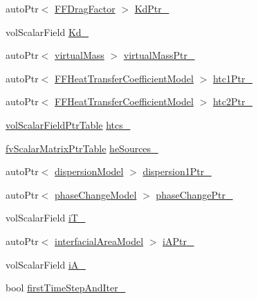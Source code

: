 \begin{DoxyCompactItemize}
\item 
auto\+Ptr$<$ \hyperlink{classFoam_1_1FFDragFactor}{F\+F\+Drag\+Factor} $>$ \hyperlink{classFoam_1_1FFPair_a4de7187addeb2b998f5759f56cb8cf88}{Kd\+Ptr\+\_\+}
\item 
vol\+Scalar\+Field \hyperlink{classFoam_1_1FFPair_a51e41ffd2b3baf262309a2669155e99c}{Kd\+\_\+}
\item 
auto\+Ptr$<$ \hyperlink{classFoam_1_1virtualMass}{virtual\+Mass} $>$ \hyperlink{classFoam_1_1FFPair_a1227c8d238e0135cb8a5c76e95ce1bfb}{virtual\+Mass\+Ptr\+\_\+}
\item 
auto\+Ptr$<$ \hyperlink{classFoam_1_1FFHeatTransferCoefficientModel}{F\+F\+Heat\+Transfer\+Coefficient\+Model} $>$ \hyperlink{classFoam_1_1FFPair_a979ece87b5bb1a7c5eac17835ba09d8a}{htc1\+Ptr\+\_\+}
\item 
auto\+Ptr$<$ \hyperlink{classFoam_1_1FFHeatTransferCoefficientModel}{F\+F\+Heat\+Transfer\+Coefficient\+Model} $>$ \hyperlink{classFoam_1_1FFPair_a3229083e4ddb7541c50f509732defb95}{htc2\+Ptr\+\_\+}
\item 
\hyperlink{classFoam_1_1FFPair_a0848121d1a9fe5a3d3471760ef9de2fe}{vol\+Scalar\+Field\+Ptr\+Table} \hyperlink{classFoam_1_1FFPair_a1fbdcaf01d7a27bcb2ee93d15c3f8992}{htcs\+\_\+}
\item 
\hyperlink{classFoam_1_1FFPair_a47dacb23df9a151e6da0902f1726ef21}{fv\+Scalar\+Matrix\+Ptr\+Table} \hyperlink{classFoam_1_1FFPair_a1fb6dd21f501635afc552fde5a0fc7b3}{he\+Sources\+\_\+}
\item 
auto\+Ptr$<$ \hyperlink{classFoam_1_1dispersionModel}{dispersion\+Model} $>$ \hyperlink{classFoam_1_1FFPair_abed55520bd9864a4313dcef87b9d53b7}{dispersion1\+Ptr\+\_\+}
\item 
auto\+Ptr$<$ \hyperlink{classFoam_1_1phaseChangeModel}{phase\+Change\+Model} $>$ \hyperlink{classFoam_1_1FFPair_a235b7644ad484d362d5da4f6f7f34c38}{phase\+Change\+Ptr\+\_\+}
\item 
vol\+Scalar\+Field \hyperlink{classFoam_1_1FFPair_aef2a560f0ccb079deb0366ff4bb37a94}{i\+T\+\_\+}
\item 
auto\+Ptr$<$ \hyperlink{classFoam_1_1interfacialAreaModel}{interfacial\+Area\+Model} $>$ \hyperlink{classFoam_1_1FFPair_a0cb5a5d576eeb7c0e38641210cc6b746}{i\+A\+Ptr\+\_\+}
\item 
vol\+Scalar\+Field \hyperlink{classFoam_1_1FFPair_a1d034617c55b900bdb73542b21ca2bb1}{i\+A\+\_\+}
\item 
bool \hyperlink{classFoam_1_1FFPair_afb9a1b92dd096336989bbbea04ee183b}{first\+Time\+Step\+And\+Iter\+\_\+}
\end{DoxyCompactItemize}


